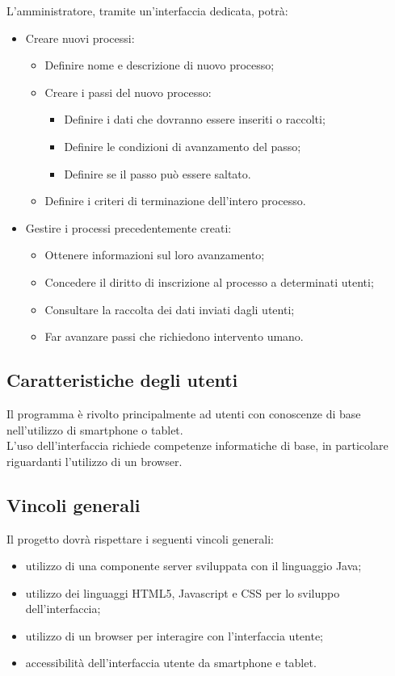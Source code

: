 L'amministratore, tramite un'interfaccia dedicata, potrà:

\begin{itemize}
\item Creare nuovi processi:
\begin{itemize}
\item Definire nome e descrizione di nuovo processo;
\item Creare i passi del nuovo processo:
\begin{itemize}
\item Definire i dati che dovranno essere inseriti o raccolti;
\item Definire le condizioni di avanzamento del passo;
\item Definire se il passo può essere saltato.
\end{itemize}
\item Definire i criteri di terminazione dell'intero processo.
\end{itemize}
\item Gestire i processi precedentemente creati:
\begin{itemize}
\item Ottenere informazioni sul loro avanzamento;
\item Concedere il diritto di inscrizione al processo a determinati utenti;
\item Consultare la raccolta dei dati inviati dagli utenti;
\item Far avanzare passi che richiedono intervento umano.
\end{itemize}
\end{itemize}

\subsection{Caratteristiche degli utenti}
Il programma è rivolto principalmente ad utenti con conoscenze di base nell'utilizzo di smartphone o tablet.\\
L'uso dell'interfaccia richiede competenze informatiche di base, in particolare riguardanti l'utilizzo di un browser.

\subsection{Vincoli generali}
Il progetto dovrà rispettare i seguenti vincoli generali:
\begin{itemize}
\item utilizzo di una componente server sviluppata con il linguaggio Java;
\item utilizzo dei linguaggi HTML5, Javascript e CSS per lo sviluppo dell'interfaccia;
\item utilizzo di un browser per interagire con l'interfaccia utente;
\item accessibilità dell'interfaccia utente da smartphone e tablet.
\end{itemize}